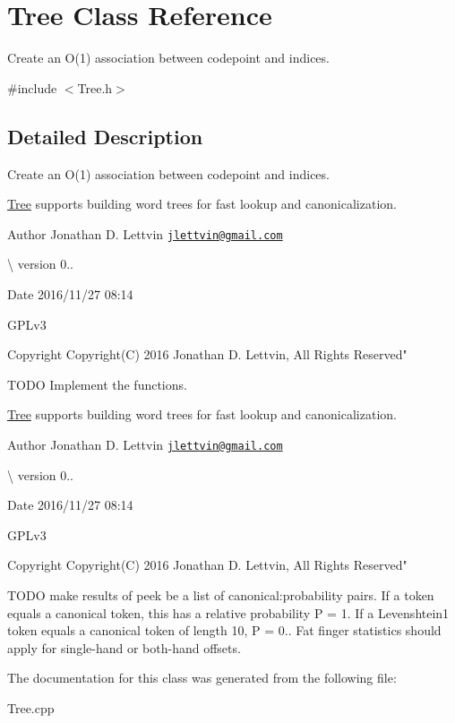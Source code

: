 \hypertarget{class_tree}{}\section{Tree Class Reference}
\label{class_tree}


Create an O(1) association between codepoint and indices.  




{\ttfamily \#include $<$Tree.\+h$>$}



\subsection{Detailed Description}
Create an O(1) association between codepoint and indices. 

\hyperlink{class_tree}{Tree} supports building word trees for fast lookup and canonicalization.

\begin{DoxyAuthor}{Author}
Jonathan D. Lettvin \href{mailto:jlettvin@gmail.com}{\tt jlettvin@gmail.\+com}
\end{DoxyAuthor}
\textbackslash{} version 0..

\begin{DoxyDate}{Date}
2016/11/27 08\+:14
\end{DoxyDate}
G\+P\+Lv3

\begin{DoxyCopyright}{Copyright}
Copyright(\+C) 2016 Jonathan D. Lettvin, All Rights Reserved"
\end{DoxyCopyright}
T\+O\+D\+O Implement the functions.

\hyperlink{class_tree}{Tree} supports building word trees for fast lookup and canonicalization.

\begin{DoxyAuthor}{Author}
Jonathan D. Lettvin \href{mailto:jlettvin@gmail.com}{\tt jlettvin@gmail.\+com}
\end{DoxyAuthor}
\textbackslash{} version 0..

\begin{DoxyDate}{Date}
2016/11/27 08\+:14
\end{DoxyDate}
G\+P\+Lv3

\begin{DoxyCopyright}{Copyright}
Copyright(\+C) 2016 Jonathan D. Lettvin, All Rights Reserved"
\end{DoxyCopyright}
T\+O\+D\+O make results of peek be a list of canonical\+:probability pairs. If a token equals a canonical token, this has a relative probability P = 1. If a Levenshtein1 token equals a canonical token of length 10, P = 0.. Fat finger statistics should apply for single-\/hand or both-\/hand offsets. 

The documentation for this class was generated from the following file\+:\begin{DoxyCompactItemize}
\item 
Tree.\+cpp\end{DoxyCompactItemize}
